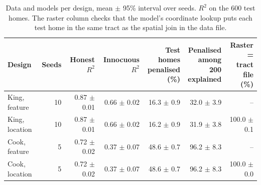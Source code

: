 \begin{table}[t]
\centering
\footnotesize
\setlength{\tabcolsep}{3.5pt}
\begin{adjustbox}{max width=\linewidth}
\begin{tabular}{lrrrrrr}
\toprule
Design & Seeds & Honest $R^2$ & \makecell[b]{Innocuous \\ $R^2$} & \makecell[b]{Test homes \\ penalised \\ (\%)} & \makecell[b]{Penalised \\ among 200 \\ explained} & \makecell[b]{Raster = \\ tract file \\ (\%)} \\
\midrule
King, feature & 10 & 0.87 $\pm$ 0.01 & 0.66 $\pm$ 0.02 & 16.3 $\pm$ 0.9 & 32.0 $\pm$ 3.9 & -- \\
King, location & 10 & 0.87 $\pm$ 0.01 & 0.66 $\pm$ 0.02 & 16.2 $\pm$ 0.9 & 31.9 $\pm$ 3.8 & 100.0 $\pm$ 0.1 \\
Cook, feature & 5 & 0.72 $\pm$ 0.02 & 0.37 $\pm$ 0.07 & 48.6 $\pm$ 0.7 & 96.2 $\pm$ 8.3 & -- \\
Cook, location & 5 & 0.72 $\pm$ 0.02 & 0.37 $\pm$ 0.07 & 48.6 $\pm$ 0.7 & 96.2 $\pm$ 8.3 & 100.0 $\pm$ 0.0 \\
\bottomrule
\end{tabular}
\end{adjustbox}
\caption{Data and models per design, mean $\pm$ 95\% interval over seeds. $R^2$ on the 600 test homes. The raster column checks that the model's coordinate lookup puts each test home in the same tract as the spatial join in the data file.}
\label{tab:data}
\end{table}
